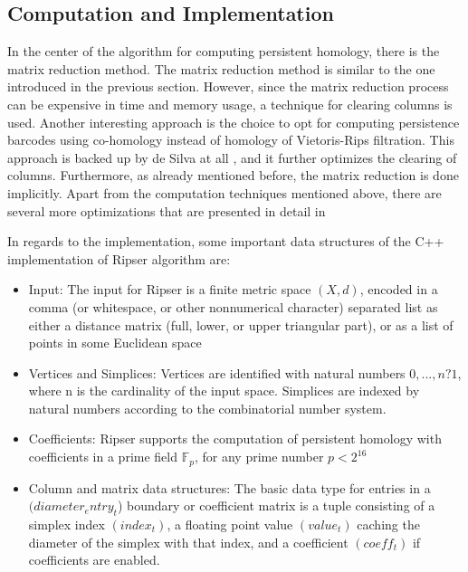 \documentclass[11pt,a4paper]{report}
\begin{document}
            \subsection{Computation and Implementation}

            In the center of the algorithm for computing persistent homology, there is the matrix reduction method. The matrix reduction method is similar to the one introduced in the previous section. However, since the matrix reduction process can be expensive in time and memory usage, a technique for clearing columns is used.
            Another interesting approach is the choice to opt for computing persistence barcodes using co-homology instead of homology of Vietoris-Rips filtration. This approach is backed up by de Silva at all \cite{de_Silvia}, and it further optimizes the clearing of columns. Furthermore, as already mentioned before, the matrix reduction is done implicitly.
            Apart from the computation techniques mentioned above, there are several more optimizations that are
            presented in detail in \cite{Bauer_2019}

            In regards to the implementation, some important data structures of the C++ implementation of Ripser algorithm are:

            \begin{itemize}
             \item Input: The input for Ripser is a finite metric space $(X, d)$, encoded in a comma (or whitespace, or other nonnumerical character) separated list as either a distance matrix (full, lower, or upper triangular part), or as a list
of points in some Euclidean space
            \item Vertices and Simplices: Vertices are identified with natural numbers ${0, . . . , n ? 1}$, where n is the cardinality of
the input space. Simplices are indexed by natural numbers according to the combinatorial number system.
            \item Coefficients: Ripser supports the computation of persistent homology with coefficients in a prime field $\mathbb{F}_p$, for any prime number $p < 2^{16}$
            \item Column and matrix data structures: The basic data type for entries in a $(diameter_entry_t$) boundary or
coefficient matrix is a tuple consisting of a simplex index $(index_t)$, a floating point value $(value_t)$ caching
the diameter of the simplex with that index, and a coefficient $(coeff_t)$ if coefficients are enabled.

            \end{itemize}
\end{document}
